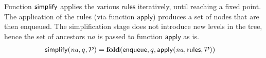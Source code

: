 Function $\mathsf{simplify}$ applies the various $\mathsf{rules}$ 
iteratively, until reaching a fixed point.
%
The application of the rules (via function
$\mathsf{apply}$) produces a set of nodes that
are then enqueued.
%
The simplification stage does not introduce new levels in the tree,
hence the set of ancestors $\mathit{na}$ is passed to function
$\mathsf{apply}$ as is.
%
\begin{align*}
  &\mathsf{simplify}(\mathit{na}, q, \mathcal P) = \mathbf{fold}(\mathsf{enqueue}, q,
    \mathsf{apply} (\mathit{na},
    \mathsf{rules}, \mathcal P))
\end{align*}


        


